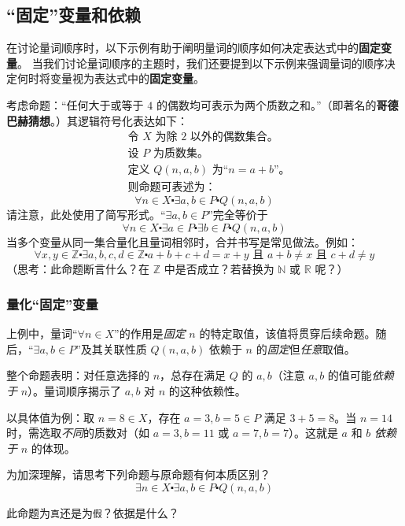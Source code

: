 \subsection{``固定''变量和依赖}\label{sec:section4.3.3}

在讨论量词顺序时，以下示例有助于阐明量词的顺序如何决定表达式中的\textbf{固定变量}。
当我们讨论量词顺序的主题时，我们还要提到以下示例来强调量词的顺序决定何时将变量视为表达式中的\textbf{固定变量}。

考虑命题：``任何大于或等于 $4$ 的偶数均可表示为两个质数之和。''（即著名的\textbf{哥德巴赫猜想}。）其逻辑符号化表达如下：
\begin{align*}
    &\text{令\ } X \text{\ 为除\ } 2 \text{\ 以外的偶数集合。}\\
    &\text{设\ } P \text{\ 为质数集。}\\
    &\text{定义\ } Q(n, a, b) \text{\ 为``}n = a + b\text{''。}\\
    &\text{则命题可表述为：}
\end{align*}
\[\forall n \in X \centerdot \exists a, b \in P \centerdot Q(n, a, b)\]
请注意，此处使用了简写形式。``$\exists a, b \in P$''完全等价于
\[\forall n \in X \centerdot \exists a \in P \centerdot \exists b \in P \centerdot Q(n, a, b)\]
当多个变量从同一集合量化且量词相邻时，合并书写是常见做法。例如：
\[\forall x, y \in \mathbb{Z} \centerdot \exists a, b, c, d \in \mathbb{Z} \centerdot a + b + c + d = x + y \text{\ 且\ } a + b \ne x \text{\ 且\ } c + d \ne y\]
（思考：此命题断言什么？在 $\mathbb{Z}$ 中是否成立？若替换为 $\mathbb{N}$ 或 $\mathbb{R}$ 呢？）

\subsubsection*{量化``固定''变量}

上例中，量词``$\forall n \in X$''的作用是\emph{固定} $n$ 的特定取值，该值将贯穿后续命题。随后，``$\exists a, b \in P$''及其关联性质 $Q(n, a, b)$ 依赖于 $n$ 的\emph{固定}但\emph{任意}取值。

整个命题表明：对任意选择的 $n$，总存在满足 $Q$ 的 $a, b$（注意 $a, b$ 的值可能\emph{依赖于} $n$）。量词顺序揭示了 $a, b$ 对 $n$ 的这种依赖性。

以具体值为例：取 $n = 8 \in X$，存在 $a = 3, b = 5 \in P$ 满足 $3 + 5 = 8$。当 $n = 14$ 时，需选取\emph{不同}的质数对（如 $a = 3, b = 11$ 或 $a = 7, b = 7$）。这就是 $a$ 和 $b$ \emph{依赖于} $n$ 的体现。

为加深理解，请思考下列命题与原命题有何本质区别？
\[\exists n \in X \centerdot \exists a, b \in P \centerdot Q(n, a, b)\]

此命题为\verb|真|还是为\verb|假|？依据是什么？

